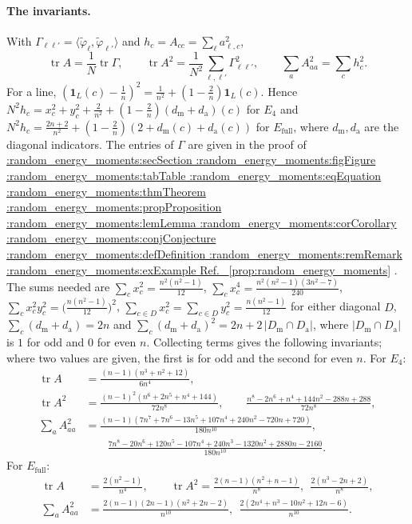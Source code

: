 \documentclass[11pt,a4paper]{article}
\makeatletter
\def\Cref@getprefix#1:#2\relax{#1}
\def\Cref@prefix@sec{sec}
\def\Cref@prefix@fig{fig}
\def\Cref@prefix@tab{tab}
\def\Cref@prefix@eq{eq}
\def\Cref@prefix@thm{thm}
\def\Cref@prefix@prop{prop}
\def\Cref@prefix@lem{lem}
\def\Cref@prefix@cor{cor}
\def\Cref@prefix@conj{conj}
\def\Cref@prefix@def{def}
\def\Cref@prefix@rem{rem}
\def\Cref@prefix@ex{ex}
\def\Cref@type@cap#1{%
  \edef\Cref@tmp{#1}%
  \ifx\Cref@tmp\Cref@prefix@sec Section%
  \else\ifx\Cref@tmp\Cref@prefix@fig Figure%
  \else\ifx\Cref@tmp\Cref@prefix@tab Table%
  \else\ifx\Cref@tmp\Cref@prefix@eq Equation%
  \else\ifx\Cref@tmp\Cref@prefix@thm Theorem%
  \else\ifx\Cref@tmp\Cref@prefix@prop Proposition%
  \else\ifx\Cref@tmp\Cref@prefix@lem Lemma%
  \else\ifx\Cref@tmp\Cref@prefix@cor Corollary%
  \else\ifx\Cref@tmp\Cref@prefix@conj Conjecture%
  \else\ifx\Cref@tmp\Cref@prefix@def Definition%
  \else\ifx\Cref@tmp\Cref@prefix@rem Remark%
  \else\ifx\Cref@tmp\Cref@prefix@ex Example%
  \else Ref.%
  \fi\fi\fi\fi\fi\fi\fi\fi\fi\fi\fi\fi
}
\DeclareRobustCommand{\Cref}[1]{%
  \begingroup
  \edef\Cref@label{#1}%
  \edef\Cref@prefix{\expandafter\Cref@getprefix\Cref@label:\relax}%
  \hyperref[#1]{\Cref@type@cap{\Cref@prefix}~\ref*{#1}}%
  \endgroup
}
\theoremstyle{plain}
\theoremstyle{definition}
\theoremstyle{remark}
\newcommand{\Efull}{E_{\mathrm{full}}}
\newcommand{\Efour}{E_4}
\newcommand{\tr}{\operatorname{tr}}
\makeatother
\begin{document}
\paragraph{The invariants.}
With $\Gamma_{\ell\ell'}=\langle\tilde\varphi_\ell,\tilde\varphi_{\ell'}\rangle$ and $h_c=A_{cc}=\sum_\ell a_{\ell,c}^2$,
\[
\tr A=\frac1N\tr\Gamma,\qquad\tr A^2=\frac1{N^2}\sum_{\ell,\ell'}\Gamma_{\ell\ell'}^2,\qquad\sum_aA_{aa}^2=\sum_ch_c^2 .
\]
For a line, $(\mathbf 1_L(c)-\frac1n)^2=\frac1{n^2}+(1-\frac2n)\mathbf 1_L(c)$.
Hence $N^2h_c=x_c^2+y_c^2+\frac2{n^2}+(1-\frac2n)(d_{\mathrm m}+d_{\mathrm a})(c)$ for $\Efour$ and $N^2h_c=\frac{2n+2}{n^2}+(1-\frac2n)(2+d_{\mathrm m}(c)+d_{\mathrm a}(c))$ for $\Efull$, where $d_{\mathrm m},d_{\mathrm a}$ are the diagonal indicators.
The entries of $\Gamma$ are given in the proof of \Cref{prop:random_energy_moments}.
The sums needed are $\sum_cx_c^2=\frac{n^2(n^2-1)}{12}$, $\sum_cx_c^4=\frac{n^2(n^2-1)(3n^2-7)}{240}$, $\sum_cx_c^2y_c^2=\bigl(\frac{n(n^2-1)}{12}\bigr)^2$, $\sum_{c\in D}x_c^2=\sum_{c\in D}y_c^2=\frac{n(n^2-1)}{12}$ for either diagonal $D$, $\sum_c(d_{\mathrm m}+d_{\mathrm a})=2n$ and $\sum_c(d_{\mathrm m}+d_{\mathrm a})^2=2n+2\,|D_{\mathrm m}\cap D_{\mathrm a}|$, where $|D_{\mathrm m}\cap D_{\mathrm a}|$ is $1$ for odd and $0$ for even $n$.
Collecting terms gives the following invariants; where two values are given, the first is for odd and the second for even $n$.
For $\Efour$:
\begin{equation}
\begin{aligned}
\tr A&=\frac{(n-1)(n^3+n^2+12)}{6n^4},\\
\tr A^2&=\frac{(n-1)^2(n^6+2n^5+n^4+144)}{72n^8},\qquad\frac{n^8-2n^6+n^4+144n^2-288n+288}{72n^8},\\
\sum_aA_{aa}^2&=\frac{(n-1)(7n^7+7n^6-13n^5+107n^4+240n^2-720n+720)}{180n^{10}},\\
&\qquad\frac{7n^8-20n^6+120n^5-107n^4+240n^3-1320n^2+2880n-2160}{180n^{10}}.
\end{aligned}
\label{eq:inv_low}
\end{equation}
For $\Efull$:
\begin{equation}
\begin{aligned}
\tr A&=\frac{2(n^2-1)}{n^4},\qquad
\tr A^2=\frac{2(n-1)(n^2+n-1)}{n^8},\ \ \frac{2(n^3-2n+2)}{n^8},\\
\sum_aA_{aa}^2&=\frac{2(n-1)(2n-1)(n^2+2n-2)}{n^{10}},\ \ \frac{2(2n^4+n^3-10n^2+12n-6)}{n^{10}}.
\end{aligned}
\label{eq:inv_full}
\end{equation}
\end{document}
